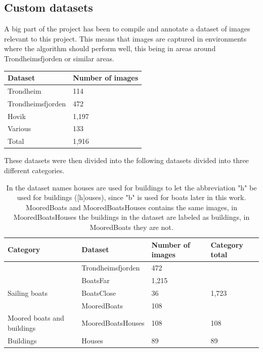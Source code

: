 \subsection{Custom datasets}
\label{sec:cust_dataset}
A big part of the project has been to compile and annotate a dataset of images relevant to this project. This means that images are captured in environments where the algorithm should perform well, this being in areas around Trondheimsfjorden or similar areas.


\begin{table}[h!]
\centering
\begin{tabular}{l|l}
Dataset           & Number of images \\ \hline
Trondheim         & 114              \\
Trondheimsfjorden & 472              \\
Hovik             & 1,197             \\
Various           & 133              \\ \hline
Total             & 1,916            
\end{tabular}
\end{table}

\newpage

\noindent
These datasets were then divided into the following datasets divided into three different categories.

\begin{table}[h!]
\centering
\begin{tabular}{l|l|l|l}
Category                   & Dataset           & Number of images & Category total \\ \hline
                           & Trondheimsfjorden & 472              &                \\
                           & BoatsFar        & 1,215             &                \\
Sailing boats              & BoatsClose      & 36               & 1,723           \\ \hline
 & MooredBoats  & 108              &             \\
Moored boats and buildings & MooredBoatsHouses  & 108              & 108            \\ \hline
Buildings                  & Houses         & 89               & 89            
\end{tabular}
\caption{In the dataset names houses are used for buildings to let the abbreviation "h" be used for buildings ([h]ouses), since "b" is used for boats later in this work. MooredBoats and MooredBoatsHouses contains the same images, in MooredBoatsHouses the buildings in the dataset are labeled as buildings, in MooredBoats they are not.}
\end{table}

